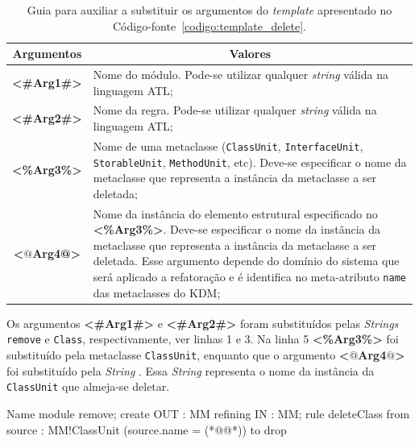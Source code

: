 \begin{table}[h]
\centering
\caption{Guia para auxiliar a substituir os argumentos do \textit{template} apresentado no Código-fonte~\ref{codigo:template_delete}.}
\label{tab:guia_template_operacao_delete}
\begin{tabular}{ | m{1.7cm} | m{12cm}| } 
\hline
\multicolumn{1}{|c|}{Argumentos}                                         & \multicolumn{1}{c|}{Valores} \\ \hline
\multicolumn{1}{|c|}{\textbf{<\#Arg1\#>}} & Nome do módulo. Pode-se utilizar qualquer \textit{string} válida na linguagem ATL; \\ 
\hline
\multicolumn{1}{|c|}{\textbf{<\#Arg2\#>}} & Nome da regra. Pode-se utilizar qualquer \textit{string} válida na linguagem ATL; \\  
\hline
\multicolumn{1}{|c|}{\textbf{<\%Arg3\%>}} & Nome de uma metaclasse (\texttt{ClassUnit}, \texttt{InterfaceUnit}, \texttt{StorableUnit}, \texttt{MethodUnit}, etc). Deve-se especificar o nome da metaclasse que representa a instância da metaclasse a ser deletada; \\ 
\hline
\multicolumn{1}{|c|}{\textbf{<$@$Arg4@>}} & Nome da instância do elemento estrutural especificado no \textbf{<\%Arg3\%>}. Deve-se especificar o nome da instância da metaclasse que representa a instância da metaclasse a ser deletada. Esse argumento depende do domínio do sistema que será aplicado a refatoração e é identifica no meta-atributo \texttt{name} das metaclasses do KDM;  \\ 
\hline
\end{tabular}
\end{table}

Os argumentos \textbf{<\#Arg1\#>} e \textbf{<\#Arg2\#>} foram substituídos pelas \textit{Strings} \texttt{remove} e \texttt{Class}, respectivamente, ver linhas 1 e 3. Na linha 5 \textbf{<\%Arg3\%>} foi substituído pela metaclasse \texttt{ClassUnit}, enquanto que o argumento \textbf{<$@$Arg4$@$>} foi substituído pela \textit{String} \texttt{}. Essa \textit{String} representa o nome da instância da \texttt{ClassUnit} que almeja-se deletar.


\begin{codigo}[caption={[ATL para realizar a operação atômica \texttt{delete} \texttt{ClassUnit}.] ATL para realizar a operação atômica \texttt{delete} \texttt{ClassUnit}.},escapeinside={(*@}{@*)}, basicstyle=\footnotesize, label={codigo:exemplo_delete_classUnit}, language=ATL]{Name}
module remove;
create OUT : MM refining IN : MM;
rule deleteClass {
  from
      source : MM!ClassUnit (source.name = (*@@*))
  to
      drop
}
\end{codigo}

